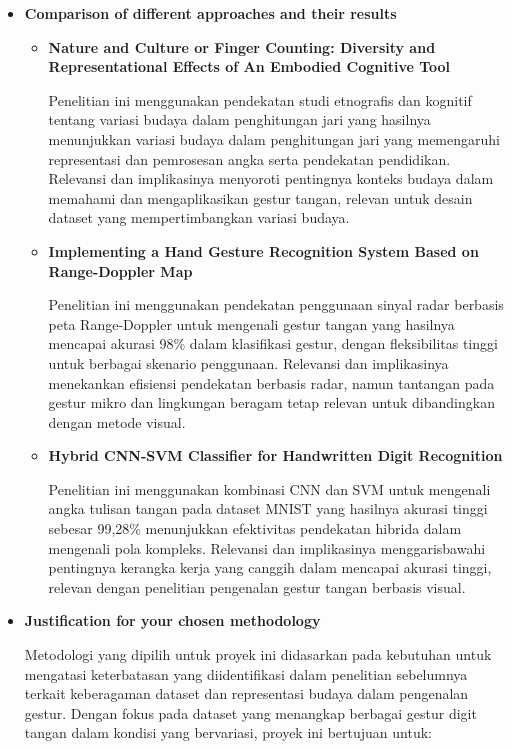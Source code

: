 \documentclass[12pt,a4paper]{article}
\begin{document}
\begin{itemize}
    \item \textbf {Comparison of different approaches and their results}
    \begin{itemize}
        \item \textbf{Nature and Culture or Finger Counting: Diversity and Representational Effects of An Embodied Cognitive Tool}
        
        \hspace{0.5cm} Penelitian ini menggunakan pendekatan studi etnografis dan kognitif tentang variasi budaya dalam penghitungan jari yang hasilnya menunjukkan variasi budaya dalam penghitungan jari yang memengaruhi representasi dan pemrosesan angka serta pendekatan pendidikan. Relevansi dan implikasinya menyoroti pentingnya konteks budaya dalam memahami dan mengaplikasikan gestur tangan, relevan untuk desain dataset yang mempertimbangkan variasi budaya.

        \item \textbf{Implementing a Hand Gesture Recognition System Based on Range-Doppler Map}
        
        \hspace{0.5cm} Penelitian ini menggunakan pendekatan penggunaan sinyal radar berbasis peta Range-Doppler untuk mengenali gestur tangan yang hasilnya mencapai akurasi 98\% dalam klasifikasi gestur, dengan fleksibilitas tinggi untuk berbagai skenario penggunaan. Relevansi dan implikasinya menekankan efisiensi pendekatan berbasis radar, namun tantangan pada gestur mikro dan lingkungan beragam tetap relevan untuk dibandingkan dengan metode visual.

        \item \textbf{Hybrid CNN-SVM Classifier for Handwritten Digit Recognition}
        
        \hspace{0.5cm} Penelitian ini menggunakan kombinasi CNN dan SVM untuk mengenali angka tulisan tangan pada dataset MNIST yang hasilnya akurasi tinggi sebesar 99,28\% menunjukkan efektivitas pendekatan hibrida dalam mengenali pola kompleks. Relevansi dan implikasinya menggarisbawahi pentingnya kerangka kerja yang canggih dalam mencapai akurasi tinggi, relevan dengan penelitian pengenalan gestur tangan berbasis visual.

    \end{itemize}
    
    \item \textbf {Justification for your chosen methodology}
    
    \hspace{0.5cm}Metodologi yang dipilih untuk proyek ini didasarkan pada kebutuhan untuk mengatasi keterbatasan yang diidentifikasi dalam penelitian sebelumnya terkait keberagaman dataset dan representasi budaya dalam pengenalan gestur. Dengan fokus pada dataset yang menangkap berbagai gestur digit tangan dalam kondisi yang bervariasi, proyek ini bertujuan untuk:


\end{itemize}
\end{document}

